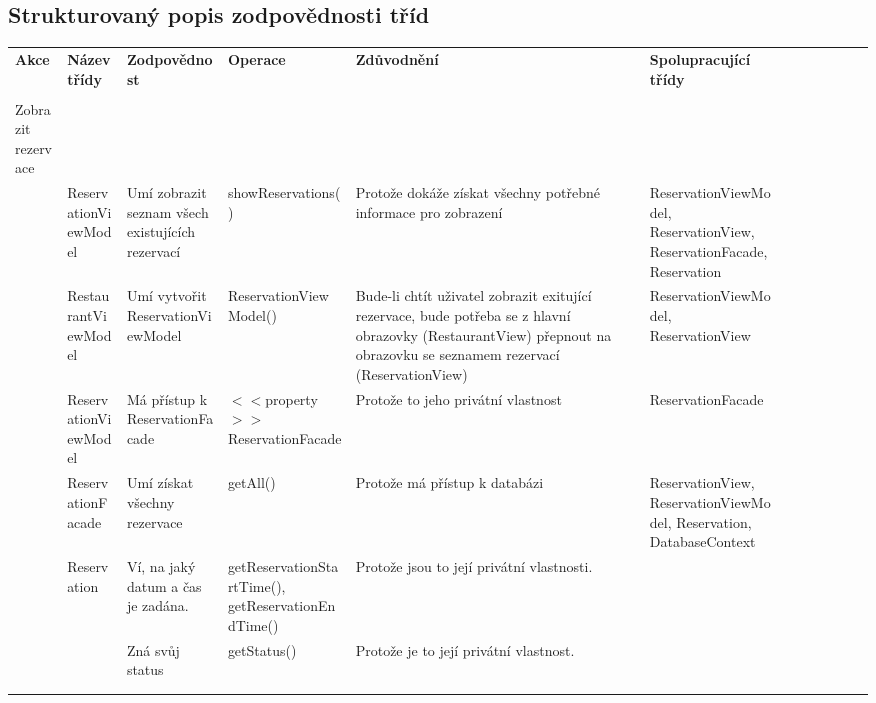 \newpage
\begin{landscape}
\section*{Strukturovaný popis zodpovědnosti tříd}


\begin{longtable}{ Lp{2cm} | Lp{3.5cm} | Lp{3cm} | Lp{4cm} | Lp{4cm} | Lp{4cm} }
  	
    \textbf{Akce} & 
      \textbf{Název třídy} & \textbf{Zodpovědnost} & \textbf{Operace} & \textbf{Zdůvodnění} & \textbf{Spolupracující třídy} \\
    
    & & & & & \\
    Zobrazit rezervace & & & & & \\
    \hline
  
    & ReservationViewModel & Umí zobrazit seznam všech existujících rezervací & showReservations() & Protože dokáže získat všechny potřebné informace pro zobrazení & ReservationViewModel, ReservationView, ReservationFacade, Reservation\\
    & RestaurantViewModel & Umí vytvořit ReservationViewModel & ReservationViewModel() & Bude-li chtít uživatel zobrazit exitující rezervace, bude potřeba se z hlavní obrazovky (RestaurantView) přepnout na obrazovku se seznamem rezervací (ReservationView) & ReservationViewModel, ReservationView \\
    & ReservationViewModel & Má přístup k ReservationFacade & $<<$property$>>$ ReservationFacade & Protože to jeho privátní vlastnost & ReservationFacade \\
    & ReservationFacade & Umí získat všechny rezervace & getAll() & Protože má přístup k databázi & ReservationView, ReservationViewModel, Reservation, DatabaseContext \\
    & Reservation & Ví, na jaký datum a čas je zadána. & getReservationStartTime(), getReservationEndTime() & Protože jsou to její privátní vlastnosti. & \\
    & & Zná svůj status & getStatus() & Protože je to její privátní vlastnost. & \\
    
    
    
    & & & & & \\
    & & & & & \\
    

\end{longtable}
\end{landscape}
